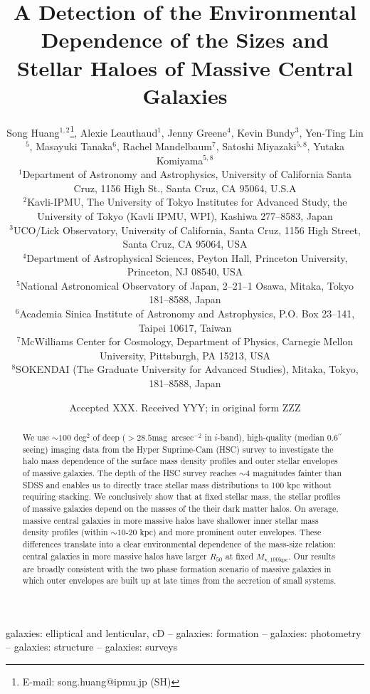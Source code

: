 \documentclass[a4paper,fleqn,usenatbib]{mnras}
\title[Structure and Environment of Massive Galaxies]{
       A Detection of the Environmental Dependence of the Sizes and Stellar Haloes
       of Massive Central Galaxies}
\author[S. Huang et al.]{
        Song Huang$^{1,2}$\thanks{E-mail: song.huang@ipmu.jp (SH)},
        Alexie Leauthaud$^{1}$,
        Jenny Greene$^{4}$,
        Kevin Bundy$^{3}$,
        \newauthor
        Yen-Ting Lin$^{5}$,
        Masayuki Tanaka$^{6}$,
        Rachel Mandelbaum$^{7}$,
        Satoshi Miyazaki$^{5,8}$,
        \newauthor
        Yutaka Komiyama$^{5,8}$
        \\
        $^{1}$Department of Astronomy and Astrophysics, University of California 
              Santa Cruz, 1156 High St., Santa Cruz, CA 95064, U.S.A\\
        $^{2}$Kavli-IPMU, The University of Tokyo Institutes for Advanced Study, 
              the University of Tokyo (Kavli IPMU, WPI), Kashiwa 277--8583, Japan\\              
        $^{3}$UCO/Lick Observatory, University of California, Santa Cruz,
              1156 High Street, Santa Cruz, CA 95064, USA\\
        $^{4}$Department of Astrophysical Sciences, Peyton Hall,
              Princeton University, Princeton, NJ 08540, USA \\
        $^{5}$National Astronomical Observatory of Japan, 2--21--1 Osawa, Mitaka, 
              Tokyo 181--8588, Japan\\
        $^{6}$Academia Sinica Institute of Astronomy and Astrophysics, 
              P.O. Box 23--141, Taipei 10617, Taiwan\\
        $^{7}$McWilliams Center for Cosmology, Department of Physics, 
              Carnegie Mellon University, Pittsburgh, PA 15213, USA\\
        $^{8}$SOKENDAI (The Graduate University for Advanced Studies), Mitaka,
              Tokyo, 181--8588, Japan
        }
\date{Accepted XXX. Received YYY; in original form ZZZ}
\def\asec{$^{\prime\prime}$}
\def\sb{mag~arcsec$^{-2}$}
\def\mtot{{$M_{\star,100\mathrm{kpc}}$}}
\begin{document}
\label{firstpage}
\pagerange{\pageref{firstpage}--\pageref{lastpage}}

\maketitle


\begin{abstract}  

    We use ${\sim}100$ deg$^2$ of deep ($>28.5$\sb{} in $i$-band), high-quality 
    (median 0.6\asec seeing) imaging data from the Hyper Suprime-Cam (HSC) survey 
    to investigate the halo mass dependence of the surface mass density profiles 
    and outer stellar envelopes of massive galaxies. 
    The depth of the HSC survey reaches ${\sim}4$ magnitudes fainter than SDSS and 
    enables us to directly trace stellar mass distributions to 100 kpc without 
    requiring stacking.  
    We conclusively show that at fixed stellar mass, the stellar profiles of massive 
    galaxies depend on the masses of the their dark matter halos. 
    On average, massive central galaxies in more massive halos have shallower inner 
    stellar mass density profiles (within ${\sim}10$-$20$ kpc) and more prominent 
    outer envelopes. 
    These differences translate into a clear environmental dependence of the 
    mass-size relation: central galaxies in more massive halos have larger 
    $R_{\mathrm{50}}$ at fixed \mtot{}.  
    Our results are broadly consistent with the two phase formation scenario of 
    massive galaxies in which outer envelopes are built up at late times from the 
    accretion of small systems. 
    
\end{abstract}

\begin{keywords}
    galaxies: elliptical and lenticular, cD --
    galaxies: formation --
    galaxies: photometry -- 
    galaxies: structure -- 
    galaxies: surveys
\end{keywords}




\end{document}
